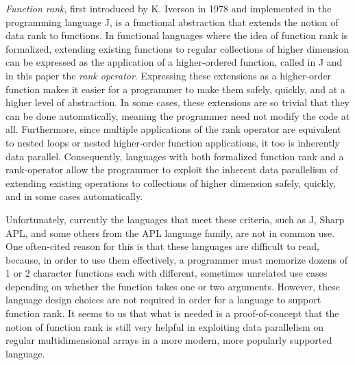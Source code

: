 \textit{Function rank}, first introduced by K. Iverson in 1978\cite{opandfunc} and implemented in the programming language J, is a functional abstraction that extends the notion of data rank to functions. %
In functional languages where the idea of function rank is formalized, extending existing functions to regular collections of higher dimension can be expressed as the application of a higher-ordered function, 
called in J and in this paper the \textit{rank operator}. \cite{jvocab}
Expressing these extensions as a higher-order function makes it easier for a programmer to make them safely, quickly, and at a higher level of abstraction.
In some cases, these extensions are so trivial that they can be done automatically, meaning the programmer need not modify the code at all. %
Furthermore, since multiple applications of the rank operator are equivalent to nested loops or nested higher-order function applications, it too is inherently data parallel.
Consequently, languages with both formalized function rank and a rank-operator allow the programmer to 
exploit the inherent data parallelism of extending existing operations to collections of higher dimension safely, quickly, and in some cases automatically.

Unfortunately, currently the languages that meet these criteria, such as J, Sharp APL, and some others from the APL language family, are not in common use. %
One often-cited reason for this is that these languages are difficult to read, %
because, in order to use them effectively, a programmer must memorize dozens of 1 or 2 character functions each with different, sometimes unrelated use cases depending on whether the function takes one or two arguments.\cite{jvocab} %
However, these language design choices are not required in order for a language to support function rank.
It seems to us that 
what is needed is a proof-of-concept that the notion of function rank is still very helpful in exploiting data parallelism on regular multidimensional arrays in a more modern, more popularly supported language. 

